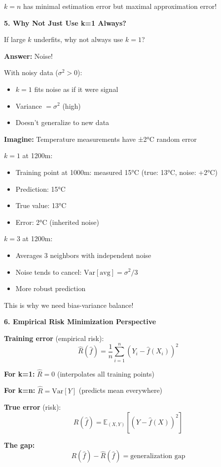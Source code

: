 \documentclass[12pt]{article}
\begin{document}
\begin{explanation}
\(k=n\) has minimal estimation error but maximal approximation error!

\textbf{5. Why Not Just Use k=1 Always?}

If large \(k\) underfits, why not always use \(k=1\)?

\textbf{Answer:} Noise!

With noisy data (\(\sigma^2 > 0\)):
\begin{itemize}
    \item \(k=1\) fits noise as if it were signal
    \item Variance \(= \sigma^2\) (high)
    \item Doesn't generalize to new data
\end{itemize}

\textbf{Imagine:} Temperature measurements have ±2°C random error

\(k=1\) at 1200m:
\begin{itemize}
    \item Training point at 1000m: measured 15°C (true: 13°C, noise: +2°C)
    \item Prediction: 15°C
    \item True value: 13°C
    \item Error: 2°C (inherited noise)
\end{itemize}

\(k=3\) at 1200m:
\begin{itemize}
    \item Averages 3 neighbors with independent noise
    \item Noise tends to cancel: \(\text{Var}[\text{avg}] = \sigma^2/3\)
    \item More robust prediction
\end{itemize}

This is why we need bias-variance balance!

\textbf{6. Empirical Risk Minimization Perspective}

\textbf{Training error} (empirical risk):
\[
\hat{R}(\hat{f}) = \frac{1}{n}\sum_{i=1}^n (Y_i - \hat{f}(X_i))^2
\]

\textbf{For k=1:} \(\hat{R} = 0\) (interpolates all training points)

\textbf{For k=n:} \(\hat{R} = \text{Var}[Y]\) (predicts mean everywhere)

\textbf{True error} (risk):
\[
R(\hat{f}) = \mathbb{E}_{(X,Y)}[(Y - \hat{f}(X))^2]
\]

\textbf{The gap:}
\[
R(\hat{f}) - \hat{R}(\hat{f}) = \text{generalization gap}
\]


\end{explanation}
\end{document}
